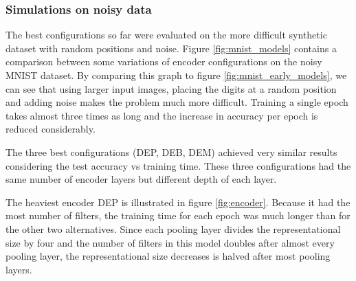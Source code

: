

\subsubsection{Simulations on noisy data}

The best configurations so far were evaluated on the more difficult synthetic dataset with random positions and noise. Figure \ref{fig:mnist_models} contains a comparison between some variations of encoder configurations on the noisy MNIST dataset.
By comparing this graph to figure \ref{fig:mnist_early_models}, we can see that using larger input images, placing the digits at a random position and adding noise makes the problem much more difficult. Training a single epoch takes almost three times as long and the increase in accuracy per epoch is reduced considerably.

The three best configurations (DEP, DEB, DEM) achieved very similar results considering the test accuracy vs training time. These three configurations had the same number of encoder layers but different depth of each layer.

The heaviest encoder DEP is illustrated in figure \ref{fig:encoder}.
Because it had the most number of filters, the training time for each epoch was much longer than for the other two alternatives.
Since each pooling layer divides the representational size by four and the number of filters in this model doubles after almost every pooling layer, the representational size decreases is halved after most pooling layers.

